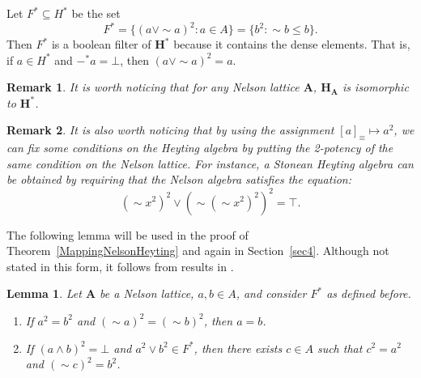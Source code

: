 \documentclass[pdflatex,sn-mathphys-num]{sn-jnl}%
\newtheorem{lemma}{Lemma}
\newcommand{\A}{\mathbf{A}}
\newcommand{\He}{\mathbf{H}}
\theoremstyle{thmstyleone}%
\theoremstyle{thmstyletwo}%
\newtheorem{remark}{Remark}%
\theoremstyle{thmstylethree}%
\begin{document}
Let $F^* \subseteq H^*$ be the set 
\[
F^* = \{ (a \vee \sim a)^2 : a \in A \} = \{ b^2 : \sim b \leq b \}.
\]
Then $F^*$ is a boolean filter of $\He^*$ because it contains the dense elements. That is, if $a\in H^*$ and $-^* a = \bot$, then $(a \vee \sim a)^2= a$.


\begin{remark}
It is worth noticing that for any Nelson lattice $\A$, $\He_\A$ is isomorphic to $\He^*$.
\end{remark}

\begin{remark} \label{transprop}
It is also worth noticing that by using the assignment $[a]_\equiv \mapsto a^2$, we can fix some conditions on the Heyting algebra by putting the 2-potency of the same condition on the Nelson lattice. For instance, a Stonean Heyting algebra can be obtained by requiring that the Nelson algebra satisfies the equation:
\[
(\sim x^2)^2 \vee (\sim(\sim x^2)^2)^2 = \top.
\]
\end{remark}

The following lemma will be used in the proof of Theorem~\ref{MappingNelsonHeyting} and again in Section~\ref{sec4}. Although not stated in this form, it follows from results in \cite{Sendlewski}.

\begin{lemma}\label{SendlewskiBoolanResult}
Let $\A$ be a Nelson lattice, $a,b \in A$, and consider $F^*$ as defined before.
\begin{enumerate}
\item If $a^2 = b^2$ and $(\sim a)^2 = (\sim b)^2$, then $a = b$.
\item If $(a \wedge b)^2 = \bot$ and $a^2 \vee b^2 \in F^*$, then there exists $c \in A$ such that $c^2 = a^2$ and $(\sim c)^2 = b^2$.
\end{enumerate}
\end{lemma}
\end{document}
